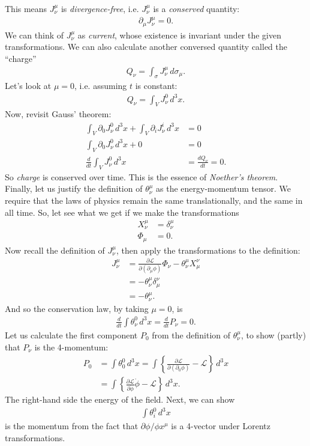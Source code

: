 \documentclass{book}
\numberwithin{equation}{section}
\theoremstyle{definition}
\newcommand{\p}{\partial}
\newcommand{\lag}{\mathcal{L}}
\begin{document}
This means $J^\mu_\nu$ is \textit{divergence-free}, i.e. $J^\mu_\nu$ is a \textit{conserved} quantity:
\begin{align}
\p_\mu J^\mu_\nu = 0.
\end{align}
We can think of $J^\mu_\nu$ as \textit{current}, whose existence is invariant under the given transformations. We can also calculate another conversed quantity called the ``charge''
\begin{align}
Q_\nu = \int_\sigma J^\mu_\nu\,d\sigma_\mu.
\end{align}
Let's look at $\mu=0$, i.e. assuming $t$ is constant:
\begin{align}
Q_\nu = \int_VJ^0_\nu\,d^3x.
\end{align}
Now, revisit Gauss' theorem:
\begin{align}
\int_V \p_0 J^0_\nu\,d^3x + \int_V \p_iJ^i_\nu\,d^3x&=0\\
\int_V \p_0 J^0_\nu\,d^3x + 0 &= 0\\
\frac{d}{dt}\int_V J^0_\nu\,d^3x &= \frac{dQ_\nu}{dt} = 0.
\end{align}
So \textit{charge} is conserved over time. This is the essence of \textit{Noether's theorem}.\\

Finally, let us justify the definition of $\theta^\mu_\nu$ as the energy-momentum tensor. We require that the laws of physics remain the same translationally, and the same in all time. So, let see what we get if we make the transformations
\begin{align}
X^\mu_\nu &= \delta^\mu_\nu\\
\Phi_\mu &= 0.
\end{align}
Now recall the definition of $J^\mu_\nu$, then apply the transformations to the definition:
\begin{align}
J^\mu_\nu &= \frac{\p\lag}{\p(\p_\mu\phi)}\Phi_\nu - \theta^\mu_\nu X^\nu_\mu\\
& = -\theta^\mu_\nu \delta ^\nu_\mu\\
& = -\theta^\mu_\nu.
\end{align}
And so the conservation law, by taking $\mu=0$, is
\begin{align}
\frac{d}{dt}\int \theta^0_\nu\,d^3x = \frac{d}{dt}P_\nu= 0.
\end{align}
Let us calculate the first component $P_0$ from the definition of $\theta^\mu_\nu$, to show (partly) that $P_\nu$ is the 4-momentum:
\begin{align}
P_0 &= \int\theta^0_0\,d^3x = \int\left\{\frac{\p \lag}{\p(\p_0\phi)} - \lag \right\} \,d^3x\\
& = \int \left\{
\frac{\p\lag}{\p\dot{\phi}}\dot{\phi} - \lag \right\}\,d^3x. 
\end{align}
The right-hand side the energy of the field. Next, we can show
\begin{align}
\int \theta^0_i\,d^3x
\end{align}
is the momentum from the fact that $\p\phi/\phi x^\mu$ is a 4-vector under Lorentz transformations. \\
\end{document}
